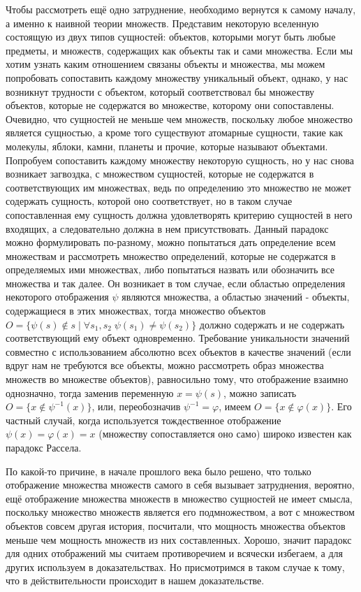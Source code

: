 \documentclass[12pt]{article}
\begin{document}
Чтобы рассмотреть ещё одно затруднение, необходимо вернутся к самому началу, а именно к наивной теории множеств. Представим некоторую вселенную состоящую из двух типов сущностей: объектов, которыми могут быть любые предметы, и множеств, содержащих как объекты так и сами множества. Если мы хотим узнать каким отношением связаны объекты и множества, мы можем попробовать сопоставить каждому множеству уникальный объект, однако, у нас возникнут трудности с объектом, который соответствовал бы множеству объектов, которые не содержатся во множестве, которому они сопоставлены. Очевидно, что сущностей не меньше чем множеств, поскольку любое множество является сущностью, а кроме того существуют атомарные сущности, такие как молекулы, яблоки, камни, планеты и прочие, которые называют объектами. Попробуем сопоставить каждому множеству некоторую сущность, но у нас снова возникает загвоздка, с множеством сущностей, которые не содержатся в соответствующих им множествах, ведь по определению это множество не может содержать сущность, которой оно соответствует, но в таком случае сопоставленная ему сущность должна удовлетворять критерию сущностей в него входящих, а следовательно должна в нем присутствовать. Данный парадокс можно формулировать по-разному, можно попытаться дать определение всем множествам и рассмотреть множество определений, которые не содержатся в определяемых ими множествах, либо попытаться назвать или обозначить все множества и так далее. Он возникает в том случае, если областью определения некоторого отображения $\psi$ являются множества, а областью значений - объекты, содержащиеся в этих множествах, тогда множество объектов $O = \{ \psi(s) \notin s \mid \forall s_1, s_2 \; \psi(s_1) \neq \psi(s_2) \}$ должно содержать и не содержать соответствующий ему объект одновременно. Требование уникальности значений совместно с использованием абсолютно всех объектов в качестве значений (если вдруг нам не требуются все объекты, можно рассмотреть образ множества множеств во множестве объектов), равносильно тому, что отображение взаимно однозначно, тогда заменив переменную $x = \psi(s)$, можно записать $O = \{ x \notin \psi^{-1}(x) \}$, или, переобозначив $\psi^{-1} = \varphi$, имеем $O = \{ x \notin \varphi(x) \}$. Его частный случай, когда используется тождественное отображение $\psi(x) = \varphi(x) = x$ (множеству сопоставляется оно само) широко известен как парадокс Рассела. 

По какой-то причине, в начале прошлого века было решено, что только отображение множества множеств самого в себя вызывает затруднения, вероятно, ещё отображение множества множеств в множество сущностей не имеет смысла, поскольку множество множеств является его подмножеством, а вот с множеством объектов совсем другая история, посчитали, что мощность множества объектов меньше чем мощность множеств из них составленных. Хорошо, значит парадокс для одних отображений мы считаем противоречием и всячески избегаем, а для других используем в доказательствах. Но присмотримся в таком случае к тому, что в действительности происходит в нашем доказательстве. 
\end{document}
